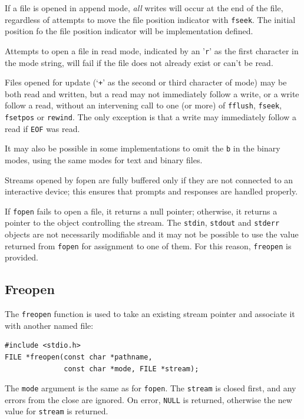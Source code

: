    If a file is opened in append mode, \textit{all} writes will occur at the
    end of the file, regardless of attempts to move the file position indicator
    with \texttt{fseek}.  The initial position fo  the file position
    indicator will be implementation defined.


   Attempts to open a file in read mode, indicated by an '\texttt{r}' as
    the  first  character  in  the mode string, will fail if the file does not
    already exist or can't be read.


   Files  opened  for  update  (`\texttt{+}'  as  the  second  or
    third character  of mode) may be both read and written, but a read may not
    immediately follow a write,  or  a  write  follow  a read,  without  an
    intervening  call  to  one  (or more) of \texttt{fflush},
    \texttt{fseek}, \texttt{fsetpos} or \texttt{rewind}.   The
    only  exception  is that a write may immediately follow a read if
    \texttt{EOF} was read.


   It may also be possible in some implementations to omit  the
    \texttt{b}  in  the  binary  modes, using the same modes for text and
    binary files.


   Streams opened by fopen are fully buffered only if they  are not
    connected  to  an interactive device; this ensures that prompts and
    responses are handled properly.


   If \texttt{fopen} fails to open a file, it returns  a  null  pointer;
    otherwise,  it  returns  a pointer to the object controlling the stream.
    The \texttt{stdin}, \texttt{stdout} and \texttt{stderr}
    objects  are  not necessarily modifiable and it may not be possible to use
    the value returned from \texttt{fopen} for assignment  to  one  of
    them.  For this reason, \texttt{freopen} is provided.


  

  \subsection{Freopen}
   

   The \texttt{freopen} function is used to take an existing stream
    pointer and associate it with another named file:


   \begin{Verbatim}
#include <stdio.h>
FILE *freopen(const char *pathname,
              const char *mode, FILE *stream);
\end{Verbatim}

   The \texttt{mode} argument is the same as for \texttt{fopen}.
    The  \texttt{stream}  is closed first, and any errors from the close
    are ignored.  On error, \texttt{NULL} is returned, otherwise the new
    value for \texttt{stream} is returned.


